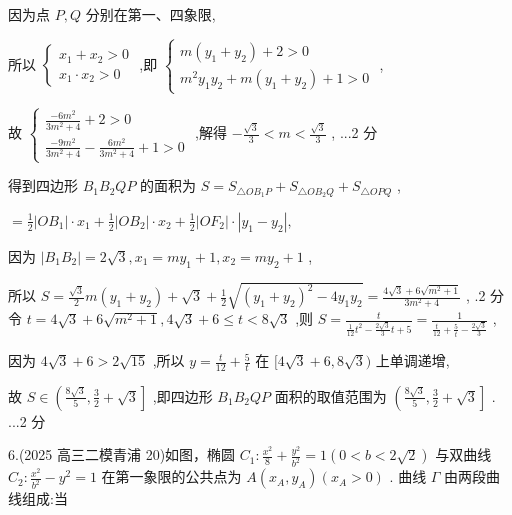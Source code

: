 \documentclass[10pt]{article}
\begin{document}
因为点 \(P,Q\) 分别在第一、四象限,

所以 \(\left\{  \begin{array}{l} {x}_{1} + {x}_{2} > 0 \\  {x}_{1} \cdot  {x}_{2} > 0 \end{array}\right.\) ,即 \(\left\{  \begin{array}{l} m\left( {{y}_{1} + {y}_{2}}\right)  + 2 > 0 \\  {m}^{2}{y}_{1}{y}_{2} + m\left( {{y}_{1} + {y}_{2}}\right)  + 1 > 0 \end{array}\right.\) ,

故 \(\left\{  \begin{array}{l} \frac{-6{m}^{2}}{3{m}^{2} + 4} + 2 > 0 \\  \frac{-9{m}^{2}}{3{m}^{2} + 4} - \frac{6{m}^{2}}{3{m}^{2} + 4} + 1 > 0 \end{array}\right.\) ,解得 \(- \frac{\sqrt{3}}{3} < m < \frac{\sqrt{3}}{3}\) , ...2 分

得到四边形 \({B}_{1}{B}_{2}{QP}\) 的面积为 \(S = {S}_{\bigtriangleup O{B}_{1}P} + {S}_{\bigtriangleup O{B}_{2}Q} + {S}_{\bigtriangleup {OPQ}}\) ,

\(= \frac{1}{2}\left| {O{B}_{1}}\right|  \cdot  {x}_{1} + \frac{1}{2}\left| {O{B}_{2}}\right|  \cdot  {x}_{2} + \frac{1}{2}\left| {O{F}_{2}}\right|  \cdot  \left| {{y}_{1} - {y}_{2}}\right| ,\)

因为 \(\left| {{B}_{1}{B}_{2}}\right|  = 2\sqrt{3},{x}_{1} = m{y}_{1} + 1,{x}_{2} = m{y}_{2} + 1\) ,

所以 \(S = \frac{\sqrt{3}}{2}m\left( {{y}_{1} + {y}_{2}}\right)  + \sqrt{3} + \frac{1}{2}\sqrt{{\left( {y}_{1} + {y}_{2}\right) }^{2} - 4{y}_{1}{y}_{2}} = \frac{4\sqrt{3} + 6\sqrt{{m}^{2} + 1}}{3{m}^{2} + 4}\) , .2 分令 \(t = 4\sqrt{3} + 6\sqrt{{m}^{2} + 1},4\sqrt{3} + 6 \leq  t < 8\sqrt{3}\) ,则 \(S = \frac{t}{\frac{1}{12}{t}^{2} - \frac{2\sqrt{3}}{3}t + 5} = \frac{1}{\frac{t}{12} + \frac{5}{t} - \frac{2\sqrt{3}}{3}}\) ,

因为 \(4\sqrt{3} + 6 > 2\sqrt{15}\) ,所以 \(y = \frac{t}{12} + \frac{5}{t}\) 在 \(\lbrack 4\sqrt{3} + 6,8\sqrt{3})\) 上单调递增,

故 \(S \in  \left( {\frac{8\sqrt{3}}{5},\frac{3}{2} + \sqrt{3}}\right\rbrack\) ,即四边形 \({B}_{1}{B}_{2}{QP}\) 面积的取值范围为 \(\left( {\frac{8\sqrt{3}}{5},\frac{3}{2} + \sqrt{3}}\right\rbrack\) . ...2 分

6.(2025 高三二模青浦 20)如图，椭圆 \({C}_{1} : \frac{{x}^{2}}{8} + \frac{{y}^{2}}{{b}^{2}} = 1\left( {0 < b < 2\sqrt{2}}\right)\) 与双曲线 \({C}_{2} : \frac{{x}^{2}}{{b}^{2}} - {y}^{2} = 1\) 在第一象限的公共点为 \(A\left( {{x}_{A},{y}_{A}}\right) \left( {{x}_{A} > 0}\right)\) . 曲线 \(\Gamma\) 由两段曲线组成:当
\end{document}
